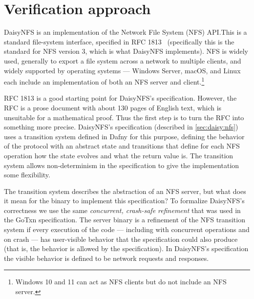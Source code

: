 \section{Verification approach}%
\label{sec:daisy:motivation}

DaisyNFS is an implementation of the Network File System (NFS) API.\@ This is a
standard file-system interface, specified in RFC 1813~\cite{RFC:1813}
(specifically this is the standard for NFS version 3, which is what DaisyNFS
implements). NFS is widely used, generally to export a file system across a
network to multiple clients, and widely supported by operating systems ---
Windows Server, macOS, and Linux each include an implementation of both an NFS
server and client.\footnote{Windows 10 and 11 can act as NFS clients but do not
include an NFS server.}

RFC 1813 is a good starting point for DaisyNFS's specification.
However, the RFC is a prose document with about 130 pages of English text,
which is unsuitable for a mathematical proof. Thus the first step is
to turn the RFC into something more precise. DaisyNFS's specification (described in
\cref{sec:daisy:nfs}) uses a
transition system defined in Dafny for this purpose, defining the behavior of
the protocol with an abstract state and transitions that define
for each NFS operation how the state evolves and what the return value is. The
transition system allows non-determinism in the specification to give the
implementation some flexibility.

The transition system describes the abstraction of an NFS server, but what does
it mean for the  binary to implement this specification? To formalize
DaisyNFS's correctness we use the same \emph{concurrent, crash-safe refinement}
that was used in the GoTxn
specification. The server binary is a refinement of the NFS transition
system if every execution of the code --- including with concurrent operations
and on crash --- has
user-visible behavior that the specification could also produce (that is, the
behavior is allowed by the specification). In DaisyNFS's specification the visible
behavior is defined to be network requests and responses.

